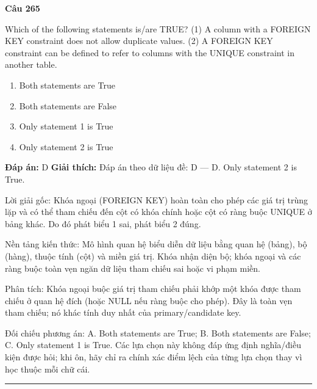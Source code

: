 \documentclass[11pt,a4paper]{article}
\newenvironment{question}[1]{%
  \par\vspace{1em}\noindent\textbf{\large Câu #1}\par\vspace{0.4em}
}{%
  \par\vspace{1em}\hrule\vspace{0.6em}
}
\newenvironment{choices}{%
  \begin{enumerate}[label=\textbf{\Alph*.},leftmargin=2.2em,itemsep=2pt,topsep=3pt]
}{%
  \end{enumerate}
}
\newcommand{\choice}{\item}
\begin{document}
\begin{question}{265}
Which of the following statements is/are TRUE? (1) A column with a FOREIGN KEY constraint does not allow duplicate values. (2) A FOREIGN KEY constraint can be defined to refer to columns with the UNIQUE constraint in another table.
\begin{choices}
\choice Both statements are True
\choice Both statements are False
\choice Only statement 1 is True
\choice Only statement 2 is True
\end{choices}
\textbf{Đáp án:} D
\textbf{Giải thích:} Đáp án theo dữ liệu đề: D — D. Only statement 2 is True.

Lời giải gốc: Khóa ngoại (FOREIGN KEY) hoàn toàn cho phép các giá trị trùng lặp và có thể tham chiếu đến cột có khóa chính hoặc cột có ràng buộc UNIQUE ở bảng khác. Do đó phát biểu 1 sai, phát biểu 2 đúng.

Nền tảng kiến thức: Mô hình quan hệ biểu diễn dữ liệu bằng quan hệ (bảng), bộ (hàng), thuộc tính (cột) và miền giá trị. Khóa nhận diện bộ; khóa ngoại và các ràng buộc toàn vẹn ngăn dữ liệu tham chiếu sai hoặc vi phạm miền.

Phân tích: Khóa ngoại buộc giá trị tham chiếu phải khớp một khóa được tham chiếu ở quan hệ đích (hoặc NULL nếu ràng buộc cho phép). Đây là toàn vẹn tham chiếu; nó khác tính duy nhất của primary/candidate key.

Đối chiếu phương án: A. Both statements are True; B. Both statements are False; C. Only statement 1 is True. Các lựa chọn này không đáp ứng định nghĩa/điều kiện được hỏi; khi ôn, hãy chỉ ra chính xác điểm lệch của từng lựa chọn thay vì học thuộc mỗi chữ cái.
\end{question}
\end{document}
